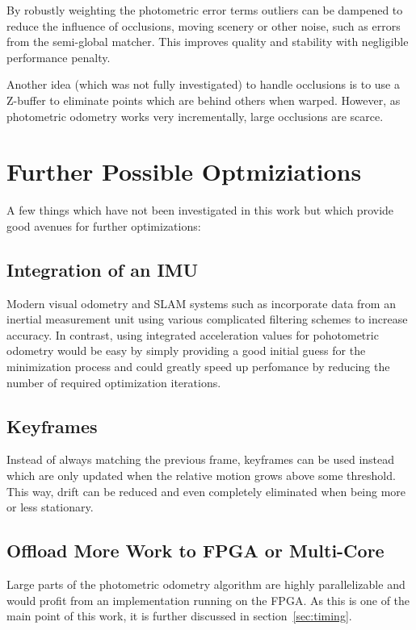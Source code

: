 By robustly weighting the photometric error terms outliers can be dampened to
reduce the influence of occlusions, moving scenery or other noise, such as
errors from the semi-global matcher. This improves quality and stability with
negligible performance penalty.

Another idea (which was not fully investigated) to handle occlusions is to use a
Z-buffer to eliminate points which are behind others when warped. However, as
photometric odometry works very incrementally, large occlusions are scarce.

\section{Further Possible Optmiziations}

A few things which have not been investigated in this work but which provide
good avenues for further optimizations:

\subsection{Integration of an IMU}

Modern visual odometry and SLAM systems such as \cite{leutenegger2013keyframe}
incorporate data from an inertial measurement unit using various complicated
filtering schemes to increase accuracy.
In contrast, using integrated acceleration values for pohotometric odometry
would be easy by simply providing a good initial guess for the minimization
process and could greatly speed up perfomance by reducing the number of
required optimization iterations.

\subsection{Keyframes}

Instead of always matching the previous frame, keyframes can be used instead
which are only updated when the relative motion grows above some threshold.
This way, drift can be reduced and even completely eliminated when being more
or less stationary.

\subsection{Offload More Work to FPGA or Multi-Core}

Large parts of the photometric odometry algorithm are highly parallelizable and
would profit from an implementation running on the FPGA. As this is one of the
main point of this work, it is further discussed in section~\ref{sec:timing}.



